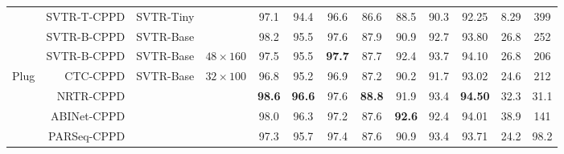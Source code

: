 \documentclass[10pt,journal,compsoc]{IEEEtran}
\begin{document}
\begin{table*}[t]
{\begin{tabular}{c|r|c|c|ccc|ccc|c|cc}
                        & SVTR-T-CPPD & SVTR-Tiny  &     & 97.1          & 94.4          & 96.6          & 86.6 & 88.5          & 90.3          & 92.25                                           & 8.29                                                                      & 399                                                               \\
& SVTR-B-CPPD  & SVTR-Base &     & 98.2 & 95.5 & 97.6 & 87.9 & 90.9 & 92.7 & 93.80                                                                       & 26.8                                                                      & 252                                                               \\
\cline{4-4}                        & SVTR-B-CPPD  & SVTR-Base &   $48\times160$  & 97.5 & 95.5 & \textbf{97.7} & 87.7 & 92.4 & 93.7 & 94.10                                                                      & 26.8                                                                      & 206                                                               \\
\hline
\multirow{4}{*}{Plug}    & CTC-CPPD & \multirow{4}{*}{SVTR-Base} & \multirow{4}{*}{$32\times100$}     & 96.8 & 95.2 & 96.9 & 87.2 & 90.2 & 91.7 & 93.02 & 24.6 &212\\
&NRTR-CPPD &     &                        & \textbf{98.6} & \textbf{96.6} & 97.6 & \textbf{88.8} & 91.9 & 93.4 & \textbf{94.50} & 32.3 & 31.1\\
&ABINet-CPPD &       &                      & 98.0 & 96.3 & 97.2 & 87.6 & \textbf{92.6} & 92.4 & 94.01 & 38.9 & 141\\
&PARSeq-CPPD &               &              & 97.3 & 95.7 & 97.4 & 87.6 & 90.9 & 93.4 & 93.71 & 24.2 &98.2\\
                        \hline
\end{tabular}
}

\label{tab:sota}
\end{table*}
\end{document}
